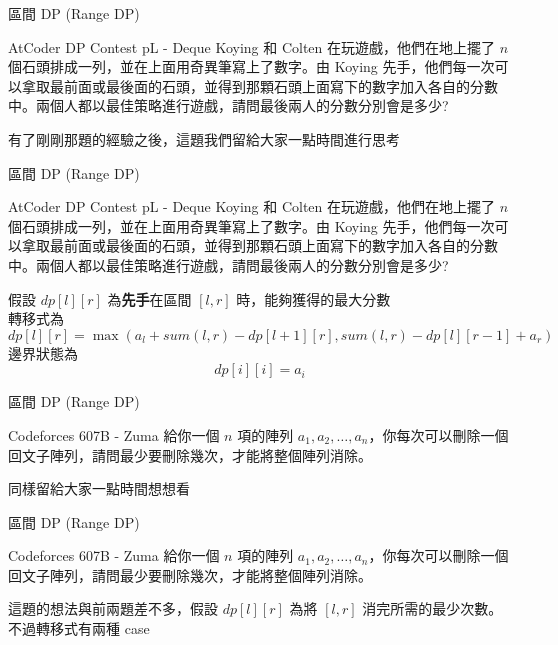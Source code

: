 \documentclass[aspectratio=169]{beamer}
\begin{document}
\begin{frame}[fragile]{區間 DP (Range DP)}
    \begin{block}{AtCoder DP Contest pL - Deque}
        Koying 和 Colten 在玩遊戲，他們在地上擺了 $n$ 個石頭排成一列，並在上面用奇異筆寫上了數字。由 Koying 先手，他們每一次可以拿取最前面或最後面的石頭，並得到那顆石頭上面寫下的數字加入各自的分數中。兩個人都以最佳策略進行遊戲，請問最後兩人的分數分別會是多少?
    \end{block} \pause
    有了剛剛那題的經驗之後，這題我們留給大家一點時間進行思考
\end{frame}

\begin{frame}[fragile]{區間 DP (Range DP)}
    \begin{block}{AtCoder DP Contest pL - Deque}
        Koying 和 Colten 在玩遊戲，他們在地上擺了 $n$ 個石頭排成一列，並在上面用奇異筆寫上了數字。由 Koying 先手，他們每一次可以拿取最前面或最後面的石頭，並得到那顆石頭上面寫下的數字加入各自的分數中。兩個人都以最佳策略進行遊戲，請問最後兩人的分數分別會是多少?
    \end{block} 
    假設 $dp[l][r]$ 為\textbf{先手}在區間 $[l,r]$ 時，能夠獲得的最大分數 \pause \\
    轉移式為
    $$dp[l][r] = \max(a_l + sum(l,r) - dp[l+1][r], sum(l,r) - dp[l][r-1] + a_r)$$ \pause 
    邊界狀態為
    $$dp[i][i] = a_i$$
\end{frame}

\begin{frame}[fragile]{區間 DP (Range DP)}
    \begin{block}{Codeforces 607B - Zuma}
        給你一個 $n$ 項的陣列 $a_1, a_2, \dots, a_n$，你每次可以刪除一個回文子陣列，請問最少要刪除幾次，才能將整個陣列消除。
    \end{block} \pause
    同樣留給大家一點時間想想看
\end{frame}

\begin{frame}[fragile]{區間 DP (Range DP)}
    \begin{block}{Codeforces 607B - Zuma}
        給你一個 $n$ 項的陣列 $a_1, a_2, \dots, a_n$，你每次可以刪除一個回文子陣列，請問最少要刪除幾次，才能將整個陣列消除。
    \end{block} 
    這題的想法與前兩題差不多，假設 $dp[l][r]$ 為將 $[l,r]$ 消完所需的最少次數。 \\
    不過轉移式有兩種 case
\end{frame}
\end{document}
